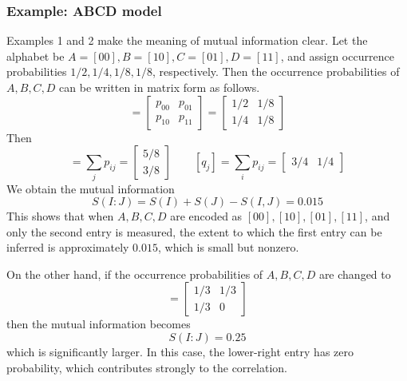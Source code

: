 \documentclass[../../../main.tex]{subfiles}
\begin{document}
\subsubsection{Example: ABCD model}
Examples 1 and 2 make the meaning of mutual information clear. 
Let the alphabet be \( A = [00], B = [10], C = [01], D = [11] \), and assign occurrence probabilities \( 1/2, 1/4, 1/8, 1/8 \), respectively. 
Then the occurrence probabilities of \( A, B, C, D \) can be written in matrix form as follows.
\begin{equation*}
  [p_{ij}] =
\begin{bmatrix}
p_{00} & p_{01} \\
p_{10} & p_{11}
\end{bmatrix}
=
\begin{bmatrix}
1 / 2 & 1 / 8 \\
1 / 4 & 1 / 8
\end{bmatrix}
\end{equation*}
Then
\begin{equation*}
  [p_i] = \sum_j p_{ij} =
\begin{bmatrix}
5 / 8 \\
3 / 8
\end{bmatrix}\qquad
[q_j] = \sum_i p_{ij} =
\begin{bmatrix}
3 / 4 & 1 / 4
\end{bmatrix}
\end{equation*}
We obtain the mutual information
\begin{equation*}
  S(I : J) = S(I) + S(J) - S(I,J) = 0.015
\end{equation*}
This shows that when \( A,B,C,D \) are encoded as \( [00],[10],[01],[11] \), and only the second entry is measured, the extent to which the first entry can be inferred is approximately \( 0.015 \), which is small but nonzero.

On the other hand, if the occurrence probabilities of \( A,B,C,D \) are changed to
\begin{equation*}
  [p_{ij}] =
\begin{bmatrix}
1 / 3 & 1 / 3 \\
1/3& 0
\end{bmatrix}
\end{equation*}
then the mutual information becomes
\begin{equation*}
  S(I : J) = 0.25
\end{equation*}
which is significantly larger. 
In this case, the lower-right entry has zero probability, which contributes strongly to the correlation.
\end{document}
